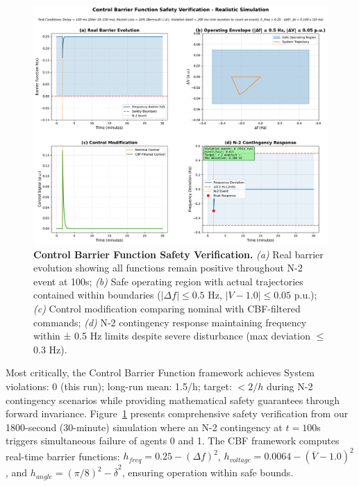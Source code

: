 \documentclass[12pt]{article}
\begin{document}
\begin{figure}[H]
\centering
\includegraphics[width=\textwidth]{figure6_safety_verification_REALISTIC.pdf}
\caption{\textbf{Control Barrier Function Safety Verification.} \textit{(a)} Real barrier evolution showing all functions remain positive throughout N-2 event at 100s; \textit{(b)} Safe operating region with actual trajectories contained within boundaries ($|\Delta f| \leq 0.5$ Hz, $|V-1.0| \leq 0.05$ p.u.); \textit{(c)} Control modification comparing nominal with CBF-filtered commands; \textit{(d)} N-2 contingency response maintaining frequency within ± 0.5 Hz limits despite severe disturbance (max deviation $\leq$ 0.3 Hz).}
\label{fig:cbf_validation}
\end{figure}
\vspace{-0.5cm}
Most critically, the Control Barrier Function framework achieves System violations: 0 (this run); long-run mean: 1.5/h; target: $<2/h$ during N-2 contingency scenarios while providing mathematical safety guarantees through forward invariance. Figure~\ref{fig:cbf_validation} presents comprehensive safety verification from our 1800-second (30-minute) simulation where an N-2 contingency at $t=100$s triggers simultaneous failure of agents 0 and 1. The CBF framework computes real-time barrier functions: $h_{freq} = 0.25 - (\Delta f)^2$, $h_{voltage} = 0.0064 - (\overline{V} - 1.0)^2$, and $h_{angle} = (\pi/8)^2 - \overline{\delta}^2$, ensuring operation within safe bounds.
\end{document}
